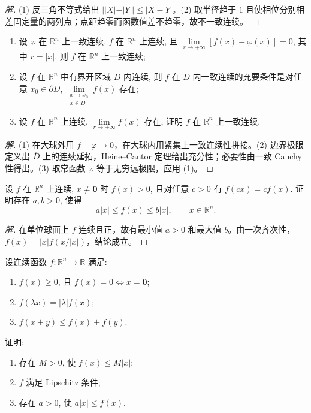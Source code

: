 \documentclass[../../数学分析培优讲义(答案版).tex]{subfiles}
\begin{document}
\begin{proof}[解]
(1) 反三角不等式给出 $||X|-|Y||\leq|X-Y|$。(2) 取半径趋于 $1$ 且使相位分别相差固定量的两列点；点距趋零而函数值差不趋零，故不一致连续。
\end{proof}

\begin{example}
\begin{enumerate}[label=(\arabic*)]
    \item 设 $\varphi$ 在 $\mathbb{R}^n$ 上一致连续, $f$ 在 $\mathbb{R}^n$ 上连续, 且 $\displaystyle\lim\limits_{r\to+\infty}[f(x)-\varphi(x)]=0$, 其中 $r=|x|$, 则 $f$ 在 $\mathbb{R}^n$ 上一致连续;
    \item 设 $f$ 在 $\mathbb{R}^n$ 中有界开区域 $D$ 内连续, 则 $f$ 在 $D$ 内一致连续的充要条件是对任意 $x_0\in\partial D$, $\displaystyle\lim\limits_{\substack{x\to x_0\\x\in D}}f(x)$ 存在;
    \item 设 $f$ 在 $\mathbb{R}^n$ 上连续, $\displaystyle\lim\limits_{r\to+\infty}f(x)$ 存在, 证明 $f$ 在 $\mathbb{R}^n$ 上一致连续.
\end{enumerate}
\end{example}

\begin{proof}[解]
(1) 在大球外用 $f-\varphi\to0$，在大球内用紧集上一致连续性拼接。(2) 边界极限定义出 $\overline D$ 上的连续延拓，Heine--Cantor 定理给出充分性；必要性由一致 Cauchy 性得出。(3) 取常函数 $\varphi$ 等于无穷远极限，应用 (1)。
\end{proof}

\begin{example}[\markstar]
设 $f$ 在 $\mathbb{R}^n$ 上连续, $x\ne\bm{0}$ 时 $f(x)>0$, 且对任意 $c>0$ 有 $f(cx)=cf(x)$. 证明存在 $a,b>0$, 使得
\[
    a|x|\leq f(x)\leq b|x|,
    \qquad x\in\mathbb{R}^n.
\]
\end{example}

\begin{proof}[解]
在单位球面上 $f$ 连续且正，故有最小值 $a>0$ 和最大值 $b$。由一次齐次性，$f(x)=|x|f(x/|x|)$，结论成立。
\end{proof}

\begin{example}[\markstar]
设连续函数 $f:\mathbb{R}^n\to\mathbb{R}$ 满足:
\begin{enumerate}[label=(\roman*)]
    \item $f(x)\geq0$, 且 $f(x)=0\iff x=\bm{0}$;
    \item $f(\lambda x)=|\lambda|f(x)$;
    \item $f(x+y)\leq f(x)+f(y)$.
\end{enumerate}
证明:
\begin{enumerate}[label=(\arabic*)]
    \item 存在 $M>0$, 使 $f(x)\leq M|x|$;
    \item $f$ 满足 Lipschitz 条件;
    \item 存在 $a>0$, 使 $a|x|\leq f(x)$.
\end{enumerate}
\end{example}
\end{document}
